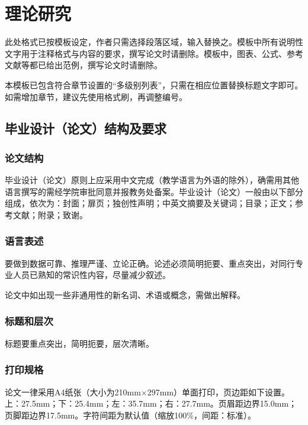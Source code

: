\chapter{理论研究}

此处格式已按模板设定，作者只需选择段落区域，输入替换之。模板中所有说明性文字用于注释格式与内容的要求，撰写论文时请删除。模板中，图表、公式、参考文献等都已给出范例，撰写论文时请删除。

本模板已包含符合章节设置的“多级别列表”，只需在相应位置替换标题文字即可。如需增加章节，建议先使用格式刷，再调整编号。

\section{毕业设计（论文）结构及要求}

\subsection{论文结构}

毕业设计（论文）原则上应采用中文完成（教学语言为外语的除外），确需用其他语言撰写的需经学院审批同意并报教务处备案。毕业设计（论文）一般由以下部分组成，依次为：封面；扉页；独创性声明；中英文摘要及关键词；目录；正文；参考文献；附录；致谢。

\subsection{语言表述}

要做到数据可靠、推理严谨、立论正确。论述必须简明扼要、重点突出，对同行专业人员已熟知的常识性内容，尽量减少叙述。

论文中如出现一些非通用性的新名词、术语或概念，需做出解释。

\subsection{标题和层次}

标题要重点突出，简明扼要，层次清晰。

\subsection{打印规格}

论文一律采用A4纸张（大小为210mm$\times$297mm）单面打印，页边距如下设置。上：27.5mm；下：25.4mm；左：35.7mm；右：27.7mm。页眉距边界15.0mm；页脚距边界17.5mm。字符间距为默认值（缩放100\%，间距：标准）。

